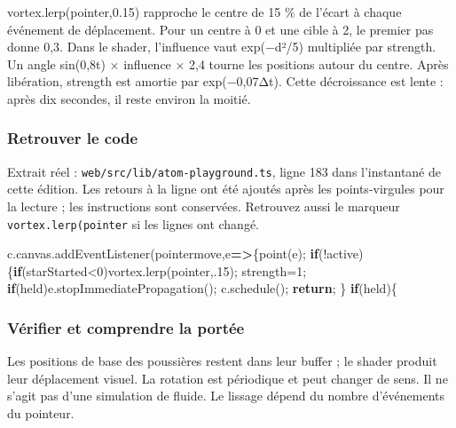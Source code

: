 \documentclass[
  canadien,
  11pt,
  letterpaper,
]{article}
\newenvironment{Shaded}{}{}
\newcommand{\AttributeTok}[1]{\textcolor[rgb]{0.49,0.56,0.16}{#1}}
\newcommand{\ControlFlowTok}[1]{\textcolor[rgb]{0.00,0.44,0.13}{\textbf{#1}}}
\newcommand{\DecValTok}[1]{\textcolor[rgb]{0.25,0.63,0.44}{#1}}
\newcommand{\FunctionTok}[1]{\textcolor[rgb]{0.02,0.16,0.49}{#1}}
\newcommand{\KeywordTok}[1]{\textcolor[rgb]{0.00,0.44,0.13}{\textbf{#1}}}
\newcommand{\NormalTok}[1]{#1}
\newcommand{\OperatorTok}[1]{\textcolor[rgb]{0.40,0.40,0.40}{#1}}
\newcommand{\StringTok}[1]{\textcolor[rgb]{0.25,0.44,0.63}{#1}}
\begin{document}
vortex.lerp(pointer,0.15) rapproche le centre de 15 \% de l'écart à
chaque événement de déplacement. Pour un centre à 0 et une cible à 2, le
premier pas donne 0,3. Dans le shader, l'influence vaut exp(−d²/5)
multipliée par strength. Un angle sin(0,8t) × influence × 2,4 tourne les
positions autour du centre. Après libération, strength est amortie par
exp(−0,07Δt). Cette décroissance est lente : après dix secondes, il
reste environ la moitié.

\subsubsection{Retrouver le code}\label{retrouver-le-code-4}

Extrait réel : \texttt{web/src/lib/atom-playground.ts}, ligne 183 dans
l'instantané de cette édition. Les retours à la ligne ont été ajoutés
après les points-virgules pour la lecture ; les instructions sont
conservées. Retrouvez aussi le marqueur \texttt{vortex.lerp(pointer} si
les lignes ont changé.

\begin{Shaded}
\begin{Highlighting}[]
\NormalTok{c}\OperatorTok{.}\AttributeTok{canvas}\OperatorTok{.}\FunctionTok{addEventListener}\NormalTok{(}\StringTok{\textquotesingle{}pointermove\textquotesingle{}}\OperatorTok{,}\NormalTok{e}\KeywordTok{=\textgreater{}}\NormalTok{\{}\FunctionTok{point}\NormalTok{(e)}\OperatorTok{;}
\ControlFlowTok{if}\NormalTok{(}\OperatorTok{!}\NormalTok{active)\{}\ControlFlowTok{if}\NormalTok{(starStarted}\OperatorTok{\textless{}}\DecValTok{0}\NormalTok{)vortex}\OperatorTok{.}\FunctionTok{lerp}\NormalTok{(pointer}\OperatorTok{,.}\DecValTok{15}\NormalTok{)}\OperatorTok{;}
\NormalTok{strength}\OperatorTok{=}\DecValTok{1}\OperatorTok{;}
\ControlFlowTok{if}\NormalTok{(held)e}\OperatorTok{.}\FunctionTok{stopImmediatePropagation}\NormalTok{()}\OperatorTok{;}
\NormalTok{c}\OperatorTok{.}\FunctionTok{schedule}\NormalTok{()}\OperatorTok{;}
\ControlFlowTok{return}\OperatorTok{;}
\NormalTok{\}}
\ControlFlowTok{if}\NormalTok{(held)\{}
\end{Highlighting}
\end{Shaded}

\subsubsection{Vérifier et comprendre la
portée}\label{vuxe9rifier-et-comprendre-la-portuxe9e-4}

Les positions de base des poussières restent dans leur buffer ; le
shader produit leur déplacement visuel. La rotation est périodique et
peut changer de sens. Il ne s'agit pas d'une simulation de fluide. Le
lissage dépend du nombre d'événements du pointeur.
\end{document}
